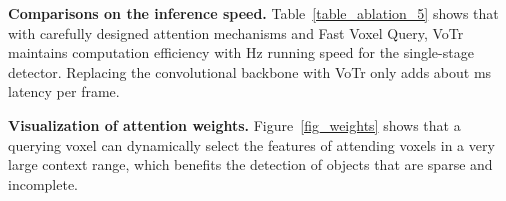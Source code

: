 \documentclass[10pt,twocolumn,letterpaper]{article}
\begin{document}
\textbf{Comparisons on the inference speed.} Table~\ref{table_ablation_5} shows that with carefully designed attention mechanisms and Fast Voxel Query, VoTr maintains computation efficiency with  Hz running speed for the single-stage detector. Replacing the convolutional backbone with VoTr only adds about  ms latency per frame. 

\textbf{Visualization of attention weights.} Figure~\ref{fig_weights} shows that a querying voxel can dynamically select the features of attending voxels in a very large context range, which benefits the detection of objects that are sparse and incomplete.



\begin{table}[]
\setlength{\belowcaptionskip}{10pt}
\caption{Effects of attention mechanisms on the KITTI val split. L.A.: Local Attention. D.A.: Dilated Attention.}
\vspace{-2mm}
\label{attention_ablation_table}
\end{table}

\begin{table}[]
\setlength{\belowcaptionskip}{10pt}
\caption{Effects of dropout probabilities on the KITTI \textit{val} split.} \label{table_ablation_2}
\vspace{-2mm}
\end{table}

\begin{table}[]
\setlength{\belowcaptionskip}{10pt}
\caption{Effects of the number of attending voxels for each querying voxel on the KITTI \textit{val} split.} \label{table_ablation_3}
\vspace{-2mm}
\end{table}
\end{document}
